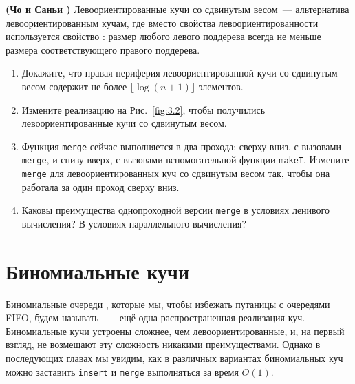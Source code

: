 \begin{exercise}\label{ex:3.4}
  \textbf{(Чо и Саньи \cite{ChoSanhi1996})} Левоориентированные кучи
  со сдвинутым весом~--- альтернатива левоориентированным кучам, где
  вместо свойства левоориентированности используется свойство
  : размер любого левого поддерева всегда не меньше размера
  соответствующего правого поддерева.
  \begin{enumerate}
  \item Докажите, что правая периферия левоориентированной кучи со
    сдвинутым весом содержит не более $\lfloor \log(n+1) \rfloor$ элементов.
  \item Измените реализацию на Рис.~\ref{fig:3.2}, чтобы получились
    левоориентированные кучи со сдвинутым весом.
  \item Функция \lstinline!merge! сейчас выполняется в два прохода:
    сверху вниз, с вызовами \lstinline!merge!, и снизу вверх, с
    вызовами вспомогательной функции \lstinline!makeT!. Измените
    \lstinline!merge! для левоориентированных куч со сдвинутым весом
    так, чтобы она работала за один проход сверху вниз.
  \item Каковы преимущества однопроходной версии \lstinline!merge! в
    условиях ленивого вычисления? В условиях параллельного вычисления? 
  \end{enumerate}
\end{exercise}

\section{Биномиальные кучи}
\label{sc:3.2}

Биномиальные очереди \cite{Vuillemin1978, Brown1978}, которые мы,
чтобы избежать путаницы с очередями FIFO, будем называть ~--- ещё одна распространенная реализация
куч. Биномиальные кучи устроены сложнее, чем левоориентированные, и, на
первый взгляд, не возмещают эту сложность никакими
преимуществами. Однако в последующих главах мы увидим, как в различных
вариантах биномиальных куч можно заставить \lstinline!insert! и
\lstinline!merge! выполняться за время $O(1)$.

